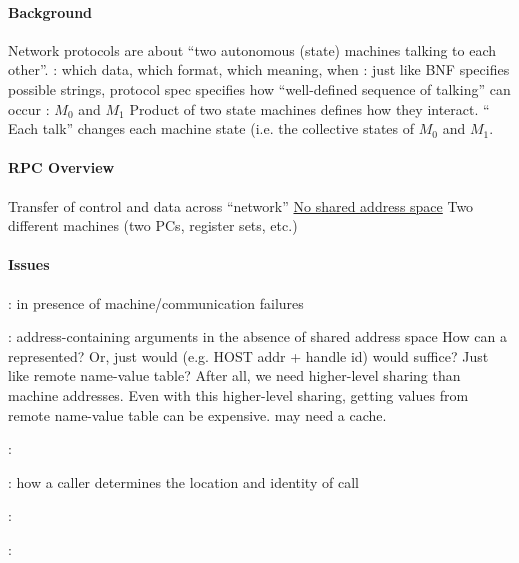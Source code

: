 \documentclass{memo}
\begin{document}
\small
{}

\paragraph{Background}
\bit
\w Network protocols are about ``two autonomous 
       (state) machines talking to each other''.
  \bit
  \w {}: which data, which format, which meaning, when
  \w {}: just like BNF specifies possible strings, 
     protocol spec specifies how ``well-defined sequence of talking'' can
     occur  
  \eit
\w {}: $M_0$ and $M_1$
   \bit
   \w Product of two state machines defines how they interact.
   \w `` Each talk'' changes each machine state (i.e. the collective 
      states of $M_0$ and $M_1$. 
   \eit
\eit

\paragraph{RPC Overview}
\bit
\w Transfer of control and data across ``network''
  \bit
  \w \underline{No shared address space}
  \w Two different machines (two PCs, register sets, etc.)
  \eit
\eit

\paragraph{Issues}
\bit
\w {}: in presence of machine/communication failures

\w {}: {address-containing arguments in the absence of
  shared address space} 
  \bit
  \w How can a  represented? Or, just would  (e.g. HOST addr + handle id) would suffice? Just like remote
     name-value table? After all, we need higher-level sharing than machine
     addresses. 
  \w Even with this higher-level sharing, getting values from remote
  name-value table can be expensive.
    \bit
    \w may need a cache.
    \eit
  \eit

\w {}:
 
\w {}:  how a caller determines the location and identity of call

\w {}:

\w {}:
\eit
\end{document}
